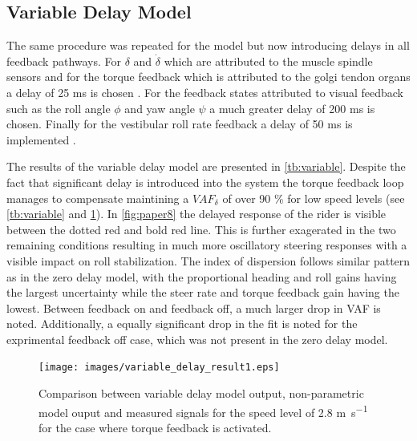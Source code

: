 \subsection{Variable Delay Model}
The same procedure was repeated for the model but now introducing  delays in all feedback pathways. For \ensuremath{\delta} and \ensuremath{\dot{\delta}} which are attributed to the muscle spindle sensors and for the torque feedback which is attributed to the golgi tendon organs  a delay of 25 \si{\milli\second} is chosen \cite{van2002identification,de2002adaptation}. For the feedback states attributed to visual feedback such as the roll angle \ensuremath{\phi} and yaw angle \ensuremath{\psi} a much greater delay of 200 \si{\milli\second} is chosen. Finally for  the vestibular roll rate feedback a delay of 50 \si{\milli\second} is implemented \cite{barnett2013vestibular}. 

The results of the variable delay model are presented in \cref{tb:variable}.  Despite the fact that significant delay is introduced into the system the torque feedback loop manages to compensate maintining a \ensuremath{\mathit{VAF}_\delta} of over 90 \% for low speed levels (see \cref{tb:variable} and \cref{fig:paper7}). In \cref{fig:paper8} the delayed response of the rider is visible between the dotted red and bold red line. This is further exagerated in the two remaining conditions resulting in much more oscillatory steering responses with a visible impact on roll stabilization. The index of dispersion follows similar pattern as in the zero delay model, with the proportional heading and roll gains having the largest uncertainty while the steer rate and  torque feedback gain having the lowest. Between feedback on and feedback off, a much larger drop in VAF is noted. Additionally, a equally significant drop in the fit is noted for the exprimental feedback off case, which was not present in the zero delay model. 






\begin{figure}[!h]
    \centering
    \captionsetup{justification=centering,margin=2cm}

    \texttt{[image: images/variable\_delay\_result1.eps]}
    \caption{Comparison between variable delay model output, non-parametric model ouput and measured signals for the speed level of 2.8 \si{\meter\per\second} for the case where torque feedback is activated.}
    \label{fig:paper7}
\end{figure}

